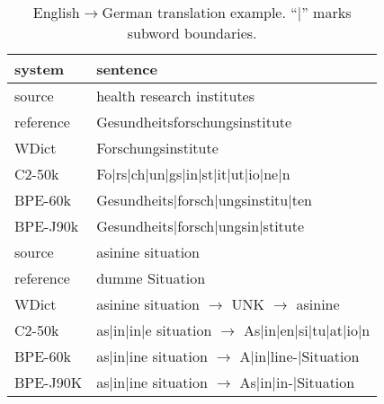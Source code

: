 \documentclass[11pt]{article}
\newcommand{\pipe}{{\color{gray}|}}
\begin{document}
\begin{table}
\centering
\small
\begin{tabular}{l|l}
system & sentence\\
\hline
source & health research institutes \\ %
reference & Gesundheitsforschungsinstitute \\
WDict & Forschungsinstitute \\
C2-50k & Fo\pipe rs\pipe ch\pipe un\pipe gs\pipe in\pipe st\pipe it\pipe ut\pipe io\pipe ne\pipe n\\
BPE-60k & Gesundheits\pipe forsch\pipe ungsinstitu\pipe ten \\
BPE-J90k & Gesundheits\pipe forsch\pipe ungsin\pipe stitute \\
\hline
source & asinine situation \\ %
reference & dumme Situation \\
WDict & asinine situation $\rightarrow$ UNK $\rightarrow$ asinine \\
C2-50k & as\pipe in\pipe in\pipe e situation $\rightarrow$ As\pipe in\pipe en\pipe si\pipe tu\pipe at\pipe io\pipe n\\
BPE-60k & as\pipe in\pipe ine situation $\rightarrow$ A\pipe in\pipe line-\pipe Situation \\
BPE-J90K & as\pipe in\pipe ine situation $\rightarrow$ As\pipe in\pipe in-\pipe Situation \\
\end{tabular}
\caption{English$\to$German translation example. ``\pipe '' marks subword boundaries.}
\label{examples-de}
\end{table}
\end{document}
